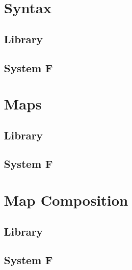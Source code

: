 \documentclass[sigplan,10pt]{acmart}
\begin{document}
  \section{Syntax}
  \subsection{Library}
  \KVariables
  \KSortTy
  \KTerms
  \subsection{System F}
  \FSort
  \FSyntax
  \FTerms

  \section{Maps}
  \subsection{Library}
  \KKit
  \KMap
  \KAp
  \KExt
  \KLift
  \KId
  \KSingle
  \KWeaken
  \KEq
  \KFunExt
  \KIdLift
  \KKitNotation
  \KTraversal
  \KKitInstances
  \KKitOpen
  \subsection{System F}
  \FTraversalOp
  \FTraversalId
  \FTraversalIdProofInteresting
  \FTraversal

  \section{Map Composition}
  \subsection{Library}
  \KWkKit
  \KWkKitInstances
  \KComposeKit
  \KComposition
  \KComposeKitAp
  \KDistLiftCompose
  \KComposeKitNotation
  \KComposeTraversal
  \KCommLiftWeaken
  \KCommLiftWeakenTraverse
  \KComposeKitInstances
  \KComposeKitInstancesConcrete
  \KWeakenCancelsSingle
  \KWeakenCancelsSingleTraverse
  \KDistLiftSingle
  \KDistLiftSingleTraverse
  \subsection{System F}
  \FAssoc
  \FAssocProofInteresting
  \FComposeTraversal
\end{document}
